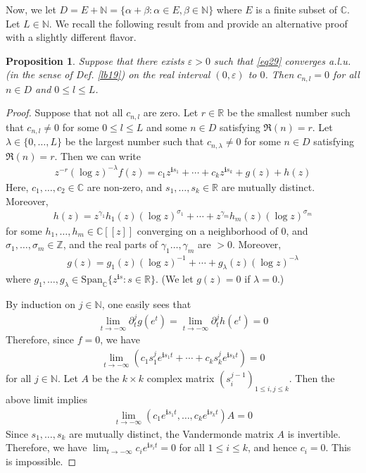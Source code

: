 \documentclass[11pt,b5paper,notitlepage]{article}
\theoremstyle{definition}
\theoremstyle{plain}
\newtheorem{pp}[df]{Proposition}
\newcommand{\Span}{\mathrm{Span}}
\newcommand{\im}{\mathbf{i}}
\newcommand{\Cbb}{\mathbb C}
\newcommand{\Nbb}{\mathbb N}
\newcommand{\Zbb}{\mathbb Z}
\newcommand{\Rbb}{\mathbb R}
\newcommand{\<}{\left\langle}
\renewcommand{\>}{\right\rangle}
\newcommand{\eps}{\varepsilon}
\numberwithin{equation}{section}
\begin{document}
Now, we let $D=E+\Nbb=\{\alpha+\beta:\alpha\in E,\beta\in \Nbb\}$ where $E$ is a finite subset of $\Cbb$. Let $L\in\Nbb$. We recall the following result from \cite[Prop. 2.1]{Huang-applicability} and provide an alternative proof with a slightly different flavor.

\begin{pp}\label{geometry11}
Suppose that there exists $\eps>0$ such that \eqref{eq29} converges a.l.u. (in the sense of Def. \ref{lb19}) on the real interval $(0,\eps)$ to $0$. Then $c_{n,l}=0$ for all $n\in D$ and $0\leq l\leq L$.
\end{pp}


\begin{proof}
Suppose that not all $c_{n,l}$ are zero. Let $r\in\Rbb$ be the smallest number such that $c_{n,l}\neq0$ for some $0\leq l\leq L$ and some $n\in D$ satisfying $\Re(n)=r$. Let $\lambda\in\{0,\dots,L\}$ be the largest number such that $c_{n,\lambda}\neq 0$ for some $n\in D$ satisfying $\Re(n)=r$. Then we can write
\begin{align*}
z^{-r}(\log z)^{-\lambda}f(z)=c_1z^{\im s_1}+\cdots+c_kz^{\im s_k}+g(z)+h(z)
\end{align*}
Here, $c_1,\dots,c_2\in\Cbb$ are non-zero, and $s_1,\dots,s_k\in\Rbb$ are mutually distinct.  Moreover,
\begin{align*}
h(z)=z^{\gamma_1}h_1(z)(\log z)^{\sigma_1}+\cdots+z^{\gamma_m}h_m(z)(\log z)^{\sigma_m}
\end{align*} 
for some $h_1,\dots,h_m\in\Cbb[[z]]$ converging on a neighborhood of $0$, and $\sigma_1,\dots,\sigma_m\in\Zbb$, and the real parts of $\gamma_1\dots,\gamma_m$ are $>0$.  Moreover,
\begin{align*}
g(z)=g_1(z)(\log z)^{-1}+\cdots+g_\lambda(z)(\log z)^{-\lambda}
\end{align*}
where $g_1,\dots,g_\lambda\in\Span_\Cbb\{z^{\im s}:s\in\Rbb\}$. (We let $g(z)=0$ if $\lambda=0$.)


By induction on $j\in\Nbb$, one easily sees that
\begin{align*}
\lim_{t\rightarrow-\infty}\partial^j_tg(e^t)=\lim_{t\rightarrow-\infty}\partial^j_th(e^t)=0
\end{align*}
Therefore, since $f=0$, we have
\begin{align*}
\lim_{t\rightarrow-\infty} (c_1s_1^je^{\im s_1t}+\cdots+c_ks_k^je^{\im s_kt})=0
\end{align*}
for all $j\in\Nbb$. Let $A$ be the $k\times k$ complex matrix $(s_i^{j-1})_{1\leq i,j\leq k}$. Then the above limit implies
\begin{align*}
\lim_{t\rightarrow-\infty}(c_1e^{\im s_1t},\dots,c_ke^{\im s_kt})A=0
\end{align*}
Since $s_1,\dots,s_k$ are mutually distinct, the Vandermonde matrix $A$ is invertible. Therefore, we have $\lim_{t\rightarrow-\infty} c_ie^{\im s_it}=0$ for all $1\leq i\leq k$, and hence $c_i=0$. This is impossible.
\end{proof}
\end{document}
